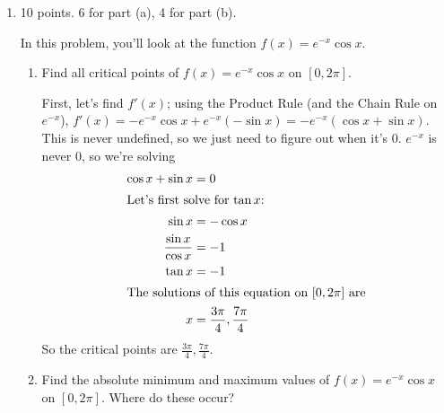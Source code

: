 \documentclass{article}
\begin{document}
\begin{enumerate}
  \begin{solution} %
    \begin{align*}
    \frac{d}{dx} \operatorname{sindeg}(x)
    &= \frac{d}{dx}  \sin( \tfrac{\pi 
    }{180}x) \\[4pt]
    &= \cos ( \tfrac{\pi}{180}x) \cdot
    \tfrac{\pi}{180} \\[4pt]
    &=\operatorname{cosdeg}(x) \cdot
    \tfrac{\pi}{180}
    \end{align*}
    So, the derivative of $\operatorname{sindeg}(x)$ is not $\operatorname{cosdeg}(x)$.
  \end{solution}  

\item 

\begin{grading}
10 points. 6 for part (a), 4 for part (b).
\end{grading}

In this problem, you'll look at the function $f(x) =
  e^{-x} \cos x$.
  \begin{enumerate}
  \item
    \begin{problem}[\nstretch{3}]
      Find all critical points of $f(x) = e^{-x} \cos x$ on $[0, 2\pi]$. 
    \end{problem}

    \begin{solution}
      First, let's find $f'(x)$; using the Product Rule (and the Chain
      Rule on $e^{-x}$), $f'(x) = - e^{-x} \cos x + e^{-x} (-\sin x) = -
      e^{-x} (\cos x + \sin x)$.  This is never undefined, so we just need
      to figure out when it's 0.  $e^{-x}$ is never 0, so we're solving
      \begin{align*}
        \cos x + \sin x &= 0 \\
        \shortintertext{Let's first solve for $\tan x$:}
        \sin x &= - \cos x \\
        \frac{\sin x}{\cos x} &= -1 \\
        \tan x &= - 1 \\
        \intertext{The solutions of this equation on $[0, 2 \pi]$ are}
        x &= \frac{3 \pi}{4}, \frac{7 \pi}{4}
      \end{align*}
      So the critical points are $\boxed{\frac{3
          \pi}{4}, \frac{7 \pi}{4}}$.
    \end{solution}

  \item
    \begin{problem}[\vfill]
      Find the absolute minimum and maximum values of $f(x) = e^{-x} \cos
      x$ on $[0, 2 \pi]$.  Where do these occur?
    \end{problem}


\end{enumerate}
\end{enumerate}
\end{document}

